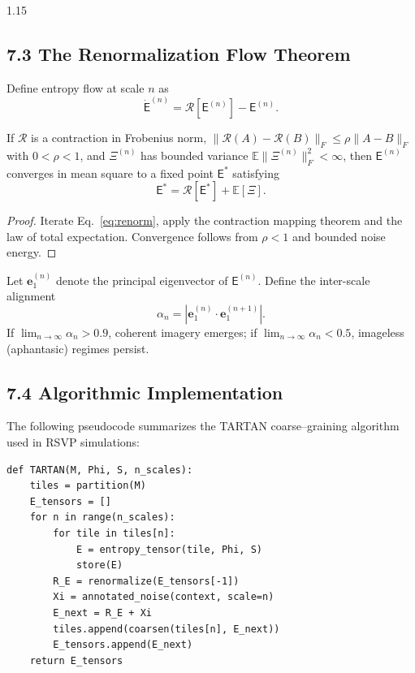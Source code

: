 \documentclass[12pt,a4paper]{article}
\begin{document}
\begin{spacing}{1.15}
\subsection{7.3 The Renormalization Flow Theorem}

Define entropy flow at scale $n$ as
\[
\dot{\mathsf{E}}^{(n)}=\mathcal{R}[\mathsf{E}^{(n)}]-\mathsf{E}^{(n)}.
\]

\begin{theorem}
If $\mathcal{R}$ is a contraction in Frobenius norm,  
$\|\mathcal{R}(A)-\mathcal{R}(B)\|_F\le\rho\|A-B\|_F$ with $0<\rho<1$,  
and $\Xi^{(n)}$ has bounded variance $\mathbb{E}\|\Xi^{(n)}\|_F^2<\infty$,  
then $\mathsf{E}^{(n)}$ converges in mean square to a fixed point $\mathsf{E}^\ast$ satisfying
\[
\mathsf{E}^\ast=\mathcal{R}[\mathsf{E}^\ast]+\mathbb{E}[\Xi].
\]
\end{theorem}

\begin{proof}
Iterate Eq.~\eqref{eq:renorm}, apply the contraction mapping theorem and the law of total expectation.  Convergence follows from $\rho<1$ and bounded noise energy.
\end{proof}

\begin{corollary}
Let $\mathbf{e}_1^{(n)}$ denote the principal eigenvector of $\mathsf{E}^{(n)}$.  
Define the inter-scale alignment
\[
\alpha_n = |\mathbf{e}_1^{(n)}\!\cdot\!\mathbf{e}_1^{(n+1)}|.
\]
If $\lim_{n\to\infty}\alpha_n>0.9$, coherent imagery emerges;  
if $\lim_{n\to\infty}\alpha_n<0.5$, imageless (aphantasic) regimes persist.
\end{corollary}

\subsection{7.4 Algorithmic Implementation}

The following pseudocode summarizes the TARTAN coarse–graining algorithm used in RSVP simulations:

\begin{verbatim}
def TARTAN(M, Phi, S, n_scales):
    tiles = partition(M)
    E_tensors = []
    for n in range(n_scales):
        for tile in tiles[n]:
            E = entropy_tensor(tile, Phi, S)
            store(E)
        R_E = renormalize(E_tensors[-1])
        Xi = annotated_noise(context, scale=n)
        E_next = R_E + Xi
        tiles.append(coarsen(tiles[n], E_next))
        E_tensors.append(E_next)
    return E_tensors
\end{verbatim}


\end{spacing}
\end{document}
